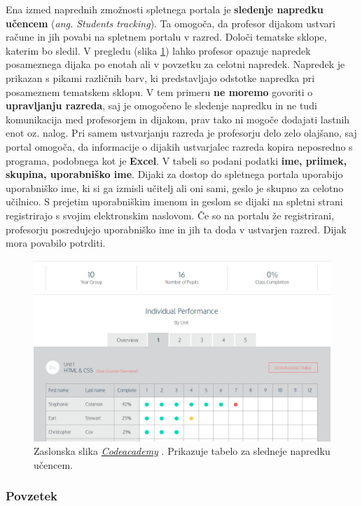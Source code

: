 Ena izmed naprednih zmožnosti spletnega portala je \textbf{sledenje
  napredku učencem} (\emph{ang. Students tracking}). Ta omogoča, da
profesor dijakom ustvari račune in jih povabi na spletnem portalu v
razred. Določi tematske sklope, katerim bo sledil. V pregledu (slika
\ref{fig:scr:web:codeacademy:tracking}) lahko profesor opazuje
napredek posameznega dijaka po enotah ali v povzetku za celotni
napredek. Napredek je prikazan s pikami različnih barv, ki
predstavljajo odstotke napredka pri posameznem tematskem sklopu. V tem
primeru \textbf{ne moremo} govoriti o \textbf{upravljanju razreda},
saj je omogočeno le sledenje napredku in ne tudi komunikacija med
profesorjem in dijakom, prav tako ni mogoče dodajati lastnih enot
oz. nalog. Pri samem ustvarjanju razreda je profesorju delo zelo
olajšano, saj portal omogoča, da informacije o dijakih ustvarjalec
razreda kopira neposredno s programa, podobnega kot je \textbf{Excel}. V
tabeli so podani podatki \textbf{ime, priimek, skupina, uporabniško
  ime}. Dijaki za dostop do spletnega portala uporabijo uporabniško
ime, ki si ga izmisli učitelj ali oni sami, geslo je skupno za celotno
učilnico. S prejetim uporabniškim imenom in geslom se dijaki na
spletni strani registrirajo s svojim elektronskim naslovom. Če so na portalu
že registrirani, profesorju posredujejo uporabniško ime in jih ta doda
v ustvarjen razred. Dijak mora povabilo potrditi.

\begin{figure}[h!]
  \centering
    \includegraphics [width=0.65\linewidth, keepaspectratio =
   1] {./images/sc_web/codeacademy_tracking_01.jpg}
   \caption{Zaslonska slika
     \emph{\href{https://www.codecademy.com/}{Codeacademy}}
     \cite{web:codeacademy}. Prikazuje tabelo za sledneje napredku
     učencem.}
    \label{fig:scr:web:codeacademy:tracking}
\end{figure}

\subsubsection{Povzetek}


